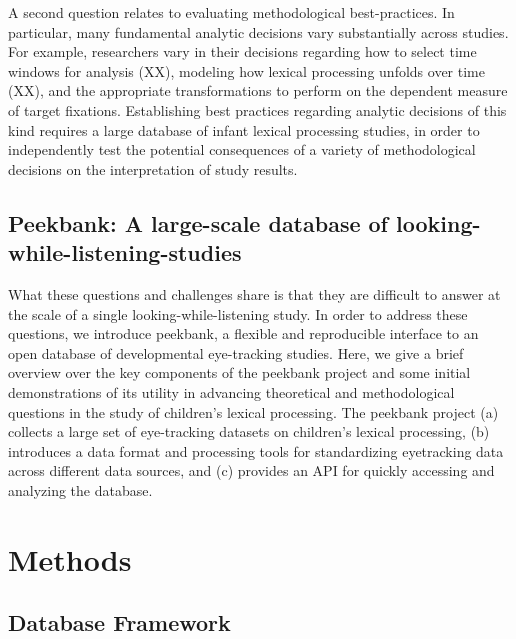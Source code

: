 \documentclass[10pt, letterpaper]{article}
\begin{document}
A second question relates to evaluating methodological best-practices.
In particular, many fundamental analytic decisions vary substantially
across studies. For example, researchers vary in their decisions
regarding how to select time windows for analysis (XX), modeling how
lexical processing unfolds over time (XX), and the appropriate
transformations to perform on the dependent measure of target fixations.
Establishing best practices regarding analytic decisions of this kind
requires a large database of infant lexical processing studies, in order
to independently test the potential consequences of a variety of
methodological decisions on the interpretation of study results.

\hypertarget{peekbank-a-large-scale-database-of-looking-while-listening-studies}{%
\subsection{Peekbank: A large-scale database of
looking-while-listening-studies}\label{peekbank-a-large-scale-database-of-looking-while-listening-studies}}

What these questions and challenges share is that they are difficult to
answer at the scale of a single looking-while-listening study. In order
to address these questions, we introduce peekbank, a flexible and
reproducible interface to an open database of developmental eye-tracking
studies. Here, we give a brief overview over the key components of the
peekbank project and some initial demonstrations of its utility in
advancing theoretical and methodological questions in the study of
children's lexical processing. The peekbank project (a) collects a large
set of eye-tracking datasets on children's lexical processing, (b)
introduces a data format and processing tools for standardizing
eyetracking data across different data sources, and (c) provides an API
for quickly accessing and analyzing the database.

\hypertarget{methods}{%
\section{Methods}\label{methods}}

\hypertarget{database-framework}{%
\subsection{Database Framework}\label{database-framework}}
\end{document}
